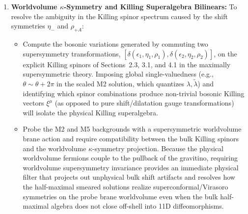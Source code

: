 \documentclass[11pt]{article}
\begin{document}
\begin{enumerate}
    \item \textbf{Worldvolume $\kappa$-Symmetry and Killing Superalgebra Bilinears:}
    To resolve the ambiguity in the Killing spinor spectrum caused by the shift symmetries $\eta_-$ and $\rho_{+A}$:
    \begin{itemize}
        \item Compute the bosonic variations generated by commuting two supersymmetry transformations, $[\delta(\epsilon_1, \eta_1, \rho_1), \delta(\epsilon_2, \eta_2, \rho_2)]$, on the explicit Killing spinors of Sections~2.3, 3.1, and 4.1 in the maximally supersymmetric theory. Imposing global single-valuedness (e.g., $\theta \sim \theta + 2\pi$ in the scaled M2 solution, which quantizes $\lambda, \tilde\lambda$) and identifying which spinor combinations produce non-trivial bosonic Killing vectors $\xi^\mu$ (as opposed to pure shift/dilatation gauge transformations) will isolate the physical Killing superalgebra.
        \item Probe the M2 and M5 backgrounds with a supersymmetric worldvolume brane action and require compatibility between the bulk Killing spinors and the worldvolume $\kappa$-symmetry projection. Because the physical worldvolume fermions couple to the pullback of the gravitino, requiring worldvolume supersymmetry invariance provides an immediate physical filter that projects out unphysical bulk shift artifacts and resolves how the half-maximal smeared solutions realize superconformal/Virasoro symmetries on the probe brane worldvolume even when the bulk half-maximal algebra does not close off-shell into 11D diffeomorphisms.
    \end{itemize}
\end{enumerate}
\end{document}
